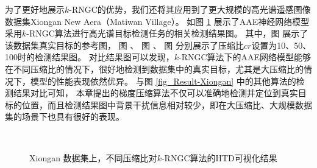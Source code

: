 \documentclass{xdupgthesis}
\begin{document}
为了更好地展示$k$-RNGC的优势，我们还将其应用到了更大规模的高光谱遥感图像数据集Xiongan New Aera（Matiwan Village）。
如图 \ref*{fig_Result-Xiongan-chapter4} 展示了AAE神经网络模型采用$k$-RNGC算法进行高光谱目标检测任务的相关检测结果图。
其中，图  展示了该数据集真实目标的参考图，
图  、
图  、
图  
分别展示了压缩比$cr$设置为10、50、100时的检测结果图。
对比结果图可以发现，$k$-RNGC算法下的AAE网络模型能够在不同压缩比的情况下，很好地检测到数据集中的真实目标，尤其是大压缩比的情况下，模型的性能表现依然优异。
与图 \ref*{fig_Result-Xiongan} 中的其他算法的检测结果对比可知，
本章提出的梯度压缩算法不仅可以准确地检测并定位到真实目标的位置，而且检测结果图中背景干扰信息相对较少，即在大压缩比、大规模数据集的场景下也具有很好的表现。

\begin{figure}[t]
    \centering
     \\
    \caption{Xiongan 数据集上，不同压缩比对$k$-RNGC算法的HTD可视化结果}
    \label{fig_Result-Xiongan-chapter4}
\end{figure}
\end{document}
